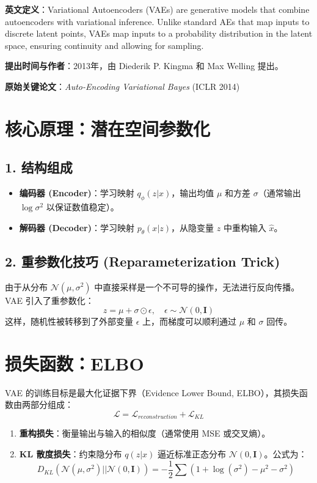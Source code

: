 \documentclass[12pt, a4paper]{book}
\begin{document}
\textbf{英文定义}：Variational Autoencoders (VAEs) are generative models that combine autoencoders with variational inference. Unlike standard AEs that map inputs to discrete latent points, VAEs map inputs to a probability distribution in the latent space, ensuring continuity and allowing for sampling.

\textbf{提出时间与作者}：2013年，由 Diederik P. Kingma 和 Max Welling 提出。

\textbf{原始关键论文}：\textit{Auto-Encoding Variational Bayes} (ICLR 2014)

\section{核心原理：潜在空间参数化}

\subsection{1. 结构组成}
\begin{itemize}
    \item \textbf{编码器 (Encoder)}：学习映射 $q_\phi(z|x)$，输出均值 $\mu$ 和方差 $\sigma$（通常输出 $\log \sigma^2$ 以保证数值稳定）。
    \item \textbf{解码器 (Decoder)}：学习映射 $p_\theta(x|z)$，从隐变量 $z$ 中重构输入 $\hat{x}$。
\end{itemize}

\subsection{2. 重参数化技巧 (Reparameterization Trick)}
由于从分布 $\mathcal{N}(\mu, \sigma^2)$ 中直接采样是一个不可导的操作，无法进行反向传播。VAE 引入了重参数化：
$$ z = \mu + \sigma \odot \epsilon, \quad \epsilon \sim \mathcal{N}(0, \mathbf{I}) $$
这样，随机性被转移到了外部变量 $\epsilon$ 上，而梯度可以顺利通过 $\mu$ 和 $\sigma$ 回传。

\section{损失函数：ELBO}
VAE 的训练目标是最大化证据下界（Evidence Lower Bound, ELBO），其损失函数由两部分组成：
$$ \mathcal{L} = \mathcal{L}_{reconstruction} + \mathcal{L}_{KL} $$
\begin{enumerate}
    \item \textbf{重构损失}：衡量输出与输入的相似度（通常使用 MSE 或交叉熵）。
    \item \textbf{KL 散度损失}：约束隐分布 $q(z|x)$ 逼近标准正态分布 $\mathcal{N}(0, \mathbf{I})$。公式为：
    $$ D_{KL}( \mathcal{N}(\mu, \sigma^2) || \mathcal{N}(0, \mathbf{I}) ) = -\frac{1}{2} \sum (1 + \log(\sigma^2) - \mu^2 - \sigma^2) $$
\end{enumerate}
\end{document}
